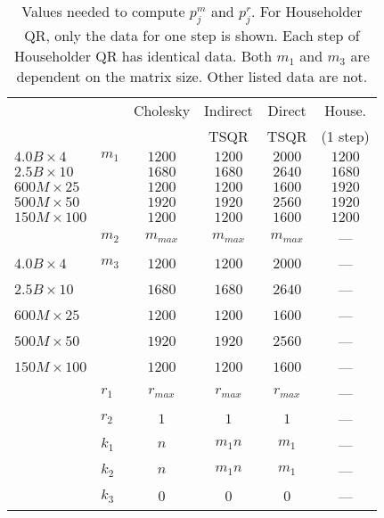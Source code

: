 \documentclass[10pt, conference, compsocconf]{IEEEtran}
\begin{document}
\begin{table}[tbp]
\setlength{\extrarowheight}{0.5pt}
\centering
\caption{Values needed to compute $p_j^m$ and $p_j^r$.  For Householder QR, only the data for one step is shown.  Each step of Householder QR has identical data.  Both   $m_1$ and $m_3$ are dependent on the matrix size.  Other listed data are not.}
\begin{tabular}{l l c c c c}
\toprule
\multicolumn{2}{l}{} & Cholesky & Indirect & Direct & House. \\
& & & TSQR & TSQR & (1 step) \\
 \midrule
             $4.0B \times 4$ & $m_1$ & $1200$ & $1200$ & $2000$ & $1200$ \\
              $2.5B \times 10$ & & $1680$ & $1680$ & $2640$ & $1680$ \\
              $600M \times 25$ & & $1200$ & $1200$ & $1600$ & $1920$ \\
              $500M \times 50$ & & $1920$ & $1920$ & $2560$ & $1920$ \\
              $150M \times 100$ & & $1200$ & $1200$ & $1600$ & $1200$ \\ \midrule
& $m_2$ & $m_{max}$ & $m_{max}$ & $m_{max}$ & --- \\ \midrule
              $4.0B \times 4$ & $m_3$ & $1200$ & $1200$ & $2000$ & --- \\
              $2.5B \times 10$ & & $1680$ & $1680$ & $2640$ & --- \\
              $600M \times 25$ & & $1200$ & $1200$ & $1600$ & --- \\
              $500M \times 50$ & & $1920$ & $1920$ & $2560$ & --- \\
              $150M \times 100$ & & $1200$ & $1200$ & $1600$ & --- \\
\midrule
& $r_1$ & $r_{max}$ & $r_{max}$ & $r_{max}$ & --- \\
& $r_2$ & $1$ & $1$ & $1$ & --- \\ 
 \midrule
& $k_1$ & $n$ & $m_1n$ & $m_1$ & ---\\
& $k_2$ & $n$ & $m_1n$ & $m_1$ & ---\\
& $k_3$ & $0$ & $0$ & $0$ & ---\\
\bottomrule
\end{tabular}
\label{tab:parallelism_vars}
\end{table}
\end{document}
